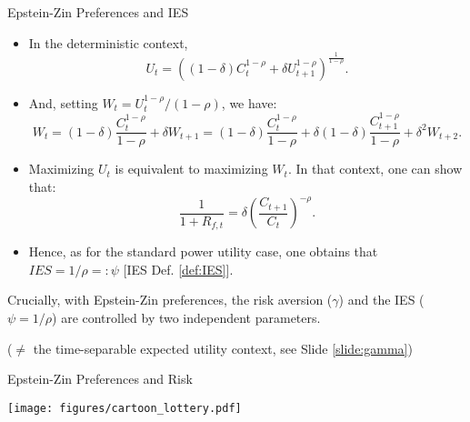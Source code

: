 \begin{frame}{Epstein-Zin Preferences and IES}
\begin{scriptsize}
\begin{itemize}
	\item In the deterministic context, 
	$$
	U_t = \left((1-\delta)C_t^{1-\rho} + \delta U_{t+1}^{1-\rho}\right)^{\frac{1}{1-\rho}}.
	$$
	\item And, setting $W_t = U_t^{1-\rho}/(1-\rho)$, we have:
	$$
	W_t = (1-\delta)\frac{C_t^{1-\rho}}{1-\rho} + \delta W_{t+1} = (1-\delta)\frac{C_t^{1-\rho}}{1-\rho} + \delta(1-\delta)\frac{C_{t+1}^{1-\rho}}{1-\rho} + \delta^2 W_{t+2}.
	$$
	\item Maximizing $U_t$ is equivalent to maximizing $W_t$. In that context, one can show that:
	$$
	\frac{1}{1+ R_{f,t}}=\delta \left(\frac{C_{t+1}}{C_t}\right)^{-\rho}.
	$$
	\item Hence, as for the standard power utility case, one obtains that $IES = 1/\rho =: \psi$ [IES Def. \ref{def:IES}].
\end{itemize}

\begin{remark} Crucially, with Epstein-Zin preferences, the risk aversion ($\gamma$) and the IES ($\psi=1/\rho$) are controlled by two independent parameters.

\vspace{.1cm}
\begin{tiny}($\ne$ the time-separable expected utility context, see Slide \ref{slide:gamma})\end{tiny}
\end{remark}
\end{scriptsize}
\end{frame}

\begin{frame}{Epstein-Zin Preferences and Risk}
\begin{center}
		\texttt{[image: figures/cartoon\_lottery.pdf]}
\end{center}
\end{frame}


